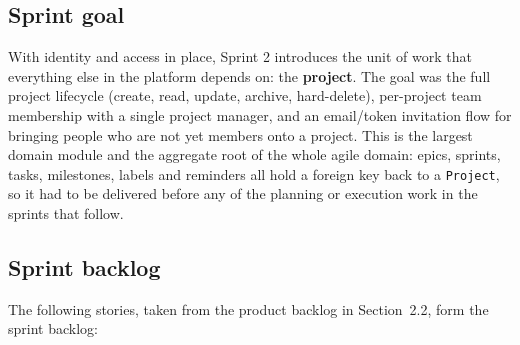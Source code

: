 \subsection{Sprint goal}

With identity and access in place, Sprint 2 introduces the unit of work that everything else
in the platform depends on: the \textbf{project}. The goal was the full project lifecycle (create,
read, update, archive, hard-delete), per-project team membership with a single project manager,
and an email/token invitation flow for bringing people who are not yet members onto a project.
This is the largest domain module and the aggregate root of the whole agile domain: epics,
sprints, tasks, milestones, labels and reminders all hold a foreign key back to a
\texttt{Project}, so it had to be delivered before any of the planning or execution work in the
sprints that follow.

\subsection{Sprint backlog}

The following stories, taken from the product backlog in Section~2.2, form the sprint backlog:

